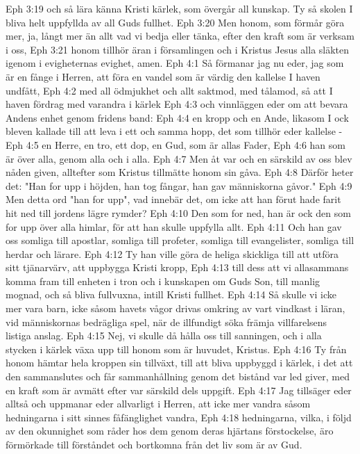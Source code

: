 Eph 3:19  och så lära känna Kristi kärlek, som övergår all kunskap. Ty så skolen I bliva helt uppfyllda av all Guds fullhet.
Eph 3:20  Men honom, som förmår göra mer, ja, långt mer än allt vad vi bedja eller tänka, efter den kraft som är verksam i oss,
Eph 3:21  honom tillhör äran i församlingen och i Kristus Jesus alla släkten igenom i evigheternas evighet, amen.
Eph 4:1  Så förmanar jag nu eder, jag som är en fånge i Herren, att föra en vandel som är värdig den kallelse I haven undfått,
Eph 4:2  med all ödmjukhet och allt saktmod, med tålamod, så att I haven fördrag med varandra i kärlek
Eph 4:3  och vinnläggen eder om att bevara Andens enhet genom fridens band:
Eph 4:4  en kropp och en Ande, likasom I ock bleven kallade till att leva i ett och samma hopp, det som tillhör eder kallelse -
Eph 4:5  en Herre, en tro, ett dop, en Gud, som är allas Fader,
Eph 4:6  han som är över alla, genom alla och i alla.
Eph 4:7  Men åt var och en särskild av oss blev nåden given, alltefter som Kristus tillmätte honom sin gåva.
Eph 4:8  Därför heter det: "Han for upp i höjden, han tog fångar, han gav människorna gåvor."
Eph 4:9  Men detta ord "han for upp", vad innebär det, om icke att han förut hade farit hit ned till jordens lägre rymder?
Eph 4:10  Den som for ned, han är ock den som for upp över alla himlar, för att han skulle uppfylla allt.
Eph 4:11  Och han gav oss somliga till apostlar, somliga till profeter, somliga till evangelister, somliga till herdar och lärare.
Eph 4:12  Ty han ville göra de heliga skickliga till att utföra sitt tjänarvärv, att uppbygga Kristi kropp,
Eph 4:13  till dess att vi allasammans komma fram till enheten i tron och i kunskapen om Guds Son, till manlig mognad, och så bliva fullvuxna, intill Kristi fullhet.
Eph 4:14  Så skulle vi icke mer vara barn, icke såsom havets vågor drivas omkring av vart vindkast i läran, vid människornas bedrägliga spel, när de illfundigt söka främja villfarelsens listiga anslag.
Eph 4:15  Nej, vi skulle då hålla oss till sanningen, och i alla stycken i kärlek växa upp till honom som är huvudet, Kristus.
Eph 4:16  Ty från honom hämtar hela kroppen sin tillväxt, till att bliva uppbyggd i kärlek, i det att den sammanslutes och får sammanhållning genom det bistånd var led giver, med en kraft som är avmätt efter var särskild dels uppgift.
Eph 4:17  Jag tillsäger eder alltså och uppmanar eder allvarligt i Herren, att icke mer vandra såsom hedningarna i sitt sinnes fåfänglighet vandra,
Eph 4:18  hedningarna, vilka, i följd av den okunnighet som råder hos dem genom deras hjärtans förstockelse, äro förmörkade till förståndet och bortkomna från det liv som är av Gud.

